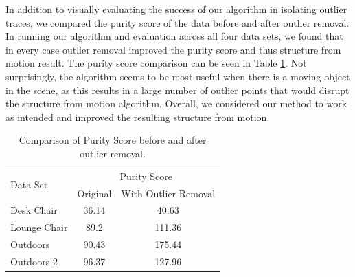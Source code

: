 In addition to visually evaluating the success of our algorithm in isolating
outlier traces, we compared the purity score of the data before and after
outlier removal.  In running our algorithm and evaluation across all four data
sets, we found that in every case outlier removal improved the purity score and
thus structure from motion result.  The purity score comparison can be seen in
Table \ref{tab:purities}.  Not surprisingly, the algorithm seems to be most
useful when there is a moving object in the scene, as this results in a large
number of outlier points that would disrupt the structure from motion
algorithm.  Overall, we considered our method to work as intended and improved
the resulting structure from motion.

\begin{table}[tb]
	\begin{center}
		\begin{tabular}{|l|c|c|}
			\hline
			\multirow{2}{*}{Data Set}  &\multicolumn{2}{|c|}{Purity Score}\\ \cline{2-3}
			& \multicolumn{1}{|c|}{Original}  & \multicolumn{1}{|c|}{With Outlier Removal}\\ \hline
			Desk Chair & 36.14 & 40.63 \\ \hline
			Lounge Chair & 89.2 & 111.36 \\ \hline
			Outdoors & 90.43 & 175.44 \\ \hline
			Outdoors 2 & 96.37 & 127.96 \\ \hline
		\end{tabular}
	\end{center}
	\caption{Comparison of Purity Score before and after outlier removal.}
	\label{tab:purities}
\end{table}


